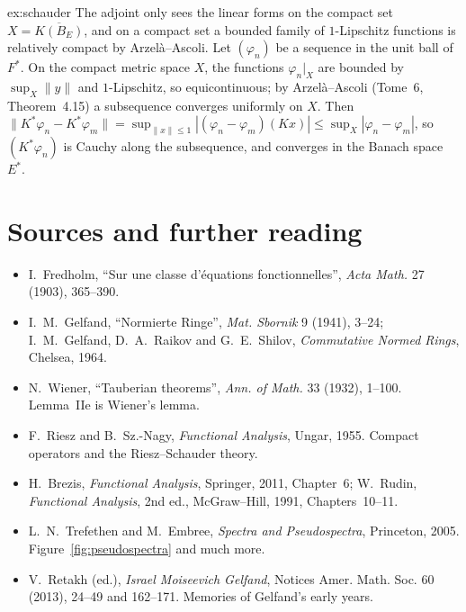 \begin{solution}{ex:schauder}
\idea The adjoint only sees the linear forms on the compact set $X=\overline{K(B_E)}$, and on a compact set a bounded family of $1$-Lipschitz functions is relatively compact by Arzel\`a--Ascoli.
\writeup Let $(\varphi_n)$ be a sequence in the unit ball of $F^*$. On the compact metric space $X$, the functions $\varphi_n|_X$ are bounded by $\sup_X\|y\|$ and $1$-Lipschitz, so equicontinuous; by Arzel\`a--Ascoli (Tome~6, Theorem~4.15) a
subsequence converges uniformly on $X$. Then $\|K^*\varphi_n-K^*\varphi_m\|=\sup_{\|x\|\le1}|(\varphi_n-\varphi_m)(Kx)|\le\sup_X|\varphi_n-\varphi_m|$, so $(K^*\varphi_n)$ is Cauchy along the subsequence, and converges in the
Banach space $E^*$.
\end{solution}

\section*{Sources and further reading}

\begin{itemize}
\item I.~Fredholm, ``Sur une classe d'\'equations fonctionnelles'', \emph{Acta Math.} 27 (1903), 365--390.
\item I.~M.~Gelfand, ``Normierte Ringe'', \emph{Mat. Sbornik} 9 (1941), 3--24; I.~M.~Gelfand, D.~A.~Raikov and G.~E.~Shilov, \emph{Commutative Normed Rings}, Chelsea, 1964.
\item N.~Wiener, ``Tauberian theorems'', \emph{Ann. of Math.} 33 (1932), 1--100. Lemma~IIe is Wiener's lemma.
\item F.~Riesz and B.~Sz.-Nagy, \emph{Functional Analysis}, Ungar, 1955. Compact operators and the Riesz--Schauder theory.
\item H.~Brezis, \emph{Functional Analysis}, Springer, 2011, Chapter~6; W.~Rudin, \emph{Functional Analysis}, 2nd ed., McGraw--Hill, 1991, Chapters~10--11.
\item L.~N.~Trefethen and M.~Embree, \emph{Spectra and Pseudospectra}, Princeton, 2005. Figure~\ref{fig:pseudospectra} and much more.
\item V.~Retakh (ed.), \emph{Israel Moiseevich Gelfand}, Notices Amer. Math. Soc. 60 (2013), 24--49 and 162--171. Memories of Gelfand's early years.
\end{itemize}
